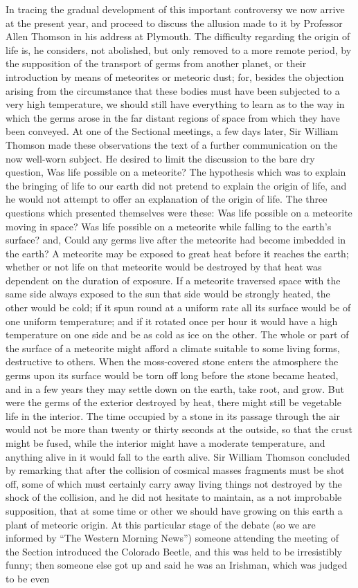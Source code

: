 \documentclass[a4paper, 11pt, oneside, english]{article}
\begin{document}
In tracing the gradual development of this important controversy we now arrive at the present year, and proceed to discuss the allusion made to it by Professor Allen Thomson in his address at Plymouth. The difficulty regarding the origin of life is, he considers, not abolished, but only removed to a more remote period, by the supposition of the transport of germs from another planet, or their introduction by means of meteorites or meteoric dust; for, besides the objection arising from the circumstance that these bodies must have been subjected to a very high temperature, we should still have everything to learn as to the way in which the germs arose in the far distant regions of space from which they have been conveyed. At one of the Sectional meetings, a few days later, Sir William Thomson made these observations the text of a further communication on the now well-worn subject. He desired to limit the discussion to the bare dry question, Was life possible on a meteorite? The hypothesis which was to explain the bringing of life to our earth did not pretend to explain the origin of life, and he would not attempt to offer an explanation of the origin of life. The three questions which presented themselves were these: Was life possible on a meteorite moving in space? Was life possible on a meteorite while falling to the earth's surface? and, Could any germs live after the meteorite had become imbedded in the earth? A meteorite may be exposed to great heat before it reaches the earth; whether or not life on that meteorite would be destroyed by that heat was dependent on the duration of exposure. If a meteorite traversed space with the same side always exposed to the sun that side would be strongly heated, the other would be cold; if it spun round at a uniform rate all its surface would be of one uniform temperature; and if it rotated once per hour it would have a high temperature on one side and be as cold as ice on the other. The whole or part of the surface of a meteorite might afford a climate suitable to some living forms, destructive to others. When the moss-covered stone enters the atmosphere the germs upon its surface would be torn off long before the stone became heated, and in a few years they may settle down on the earth, take root, and grow. But were the germs of the exterior destroyed by heat, there might still be vegetable life in the interior. The time occupied by a stone in its passage through the air would not be more than twenty or thirty seconds at the outside, so that the crust might be fused, while the interior might have a moderate temperature, and anything alive in it would fall to the earth alive. Sir William Thomson concluded by remarking that after the collision of cosmical masses fragments must be shot off, some of which must certainly carry away living things not destroyed by the shock of the collision, and he did not hesitate to maintain, as a not improbable supposition, that at some time or other we should have growing on this earth a plant of meteoric origin. At this particular stage of the debate (so we are informed by ``The Western Morning News'') someone attending the meeting of the Section introduced the Colorado Beetle, and this was held to be irresistibly funny; then someone else got up and said he was an Irishman, which was judged to be even 
\end{document}
